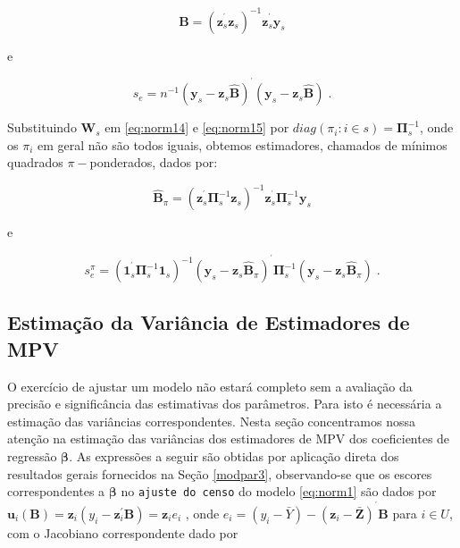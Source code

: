 \documentclass[]{book}
\theoremstyle{definition}
\theoremstyle{definition}
\theoremstyle{definition}
\theoremstyle{remark}
\begin{document}
\begin{equation}
\widehat{\mathbf{B}}=\left( \mathbf{z}_{s}^{^{\prime }}\mathbf{z}_{s}\right)
^{-1}\mathbf{z}_{s}^{^{\prime }}\mathbf{y}_{s}  \label{eq:norm16}
\end{equation}

e

\begin{equation}
s_{e}=n^{-1}\left( \mathbf{y}_{s}-\mathbf{z}_{s}\widehat{\mathbf{B}}\right)
^{^{\prime }}\left( \mathbf{y}_{s}-\mathbf{z}_{s}\widehat{\mathbf{B}}\right)
\;.  \label{eq:norm17}
\end{equation}

Substituindo \(\mathbf{W}_{s}\) em \eqref{eq:norm14} e \eqref{eq:norm15} por
\(diag\left( \pi _{i}:i\in s\right) =\mathbf{\Pi }_{s}^{-1}\), onde os
\(\pi _{i}\) em geral não são todos iguais, obtemos estimadores,
chamados de mínimos quadrados \(\pi -\)ponderados, dados por:

\begin{equation}
\widehat{\mathbf{B}}_{\pi }=\left( \mathbf{z}_{s}^{^{\prime }}\mathbf{\Pi }
_{s}^{-1}\mathbf{z}_{s}\right) ^{-1}\mathbf{z}_{s}^{^{\prime }}\mathbf{\Pi }
_{s}^{-1}\mathbf{y}_{s}  \label{eq:norm18}
\end{equation}

e

\begin{equation}
s_{e}^{\pi }=\left( \mathbf{1}_{s}^{^{\prime }}\mathbf{\Pi }_{s}^{-1}\mathbf{
1}_{s}\right) ^{-1}\left( \mathbf{y}_{s}-\mathbf{z}_{s}\widehat{\mathbf{B}}
_{\pi }\right) ^{^{\prime }}\mathbf{\Pi }_{s}^{-1}\left( \mathbf{y}_{s}-
\mathbf{z}_{s}\widehat{\mathbf{B}}_{\pi }\right) \;.  \label{eq:norm19}
\end{equation}

\subsection{Estimação da Variância de Estimadores de
MPV}\label{estimacao-da-variancia-de-estimadores-de-mpv}

O exercício de ajustar um modelo não estará completo sem a avaliação da
precisão e significância das estimativas dos parâmetros. Para isto é
necessária a estimação das variâncias correspondentes. Nesta seção
concentramos nossa atenção na estimação das variâncias dos estimadores
de MPV dos coeficientes de regressão \(\mathbf{\beta}\). As expressões a
seguir são obtidas por aplicação direta dos resultados gerais fornecidos
na Seção \ref{modpar3}, observando-se que os escores correspondentes a
\(\mathbf{\beta}\) no \texttt{ajuste\ do\ censo} do modelo
\eqref{eq:norm1} são dados por
\(\mathbf{u}_{i}\left( \mathbf{B}\right) =\mathbf{z}_{i}\left( y_{i}-\mathbf{z}_{i}^{\prime }\mathbf{B}\right) =\mathbf{z} _{i}e_{i}\)
, onde
\(e_{i}=\left( y_{i}-\bar{Y}\right) -\left( \mathbf{z}_{i}-\mathbf{\bar{Z}}\right) ^{^{\prime }}\mathbf{B}\)
para \(i\in U\), com o Jacobiano correspondente dado por
\end{document}
